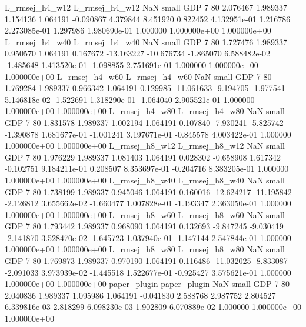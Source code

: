 L_rmsej_h4_w12 L_rmsej_h4_w12                   NaN      small      GDP                 7 80 2.076467       1.989337 1.154136       1.064191   -0.090867      4.379844      8.451920     0.822452   4.132951e-01  1.216786 2.273085e-01     1.297986   1.980690e-01            1.000000    1.000000e+00        1.000000e+00
L_rmsej_h4_w40 L_rmsej_h4_w40                   NaN      small      GDP                 7 80 1.727476       1.989337 0.950570       1.064191    0.167672    -13.163227    -10.676734    -1.865070   6.588482e-02 -1.485648 1.413520e-01    -1.098855   2.751691e-01            1.000000    1.000000e+00        1.000000e+00
L_rmsej_h4_w60 L_rmsej_h4_w60                   NaN      small      GDP                 7 80 1.769284       1.989337 0.966342       1.064191    0.129985    -11.061633     -9.194705    -1.977541   5.146818e-02 -1.522691 1.318290e-01    -1.064040   2.905521e-01            1.000000    1.000000e+00        1.000000e+00
L_rmsej_h4_w80 L_rmsej_h4_w80                   NaN      small      GDP                 7 80 1.831578       1.989337 1.002194       1.064191    0.107840     -7.930241     -5.825742    -1.390878   1.681677e-01 -1.001241 3.197671e-01    -0.845578   4.003422e-01            1.000000    1.000000e+00        1.000000e+00
L_rmsej_h8_w12 L_rmsej_h8_w12                   NaN      small      GDP                 7 80 1.976229       1.989337 1.081403       1.064191    0.028302     -0.658908      1.617342    -0.102751   9.184211e-01  0.208507 8.353697e-01    -0.204716   8.383205e-01            1.000000    1.000000e+00        1.000000e+00
L_rmsej_h8_w40 L_rmsej_h8_w40                   NaN      small      GDP                 7 80 1.738199       1.989337 0.945046       1.064191    0.160016    -12.624217    -11.195842    -2.126812   3.655662e-02 -1.660477 1.007828e-01    -1.193347   2.363050e-01            1.000000    1.000000e+00        1.000000e+00
L_rmsej_h8_w60 L_rmsej_h8_w60                   NaN      small      GDP                 7 80 1.793442       1.989337 0.968090       1.064191    0.132693     -9.847245     -9.030419    -2.141870   3.528470e-02 -1.645723 1.037940e-01    -1.147144   2.547844e-01            1.000000    1.000000e+00        1.000000e+00
L_rmsej_h8_w80 L_rmsej_h8_w80                   NaN      small      GDP                 7 80 1.769873       1.989337 0.970190       1.064191    0.116486    -11.032025     -8.833087    -2.091033   3.973939e-02 -1.445518 1.522677e-01    -0.925427   3.575621e-01            1.000000    1.000000e+00        1.000000e+00
  paper_plugin   paper_plugin                   NaN      small      GDP                 7 80 2.040836       1.989337 1.095986       1.064191   -0.041830      2.588768      2.987752     2.804527   6.339816e-03  2.818299 6.098230e-03     1.902809   6.070889e-02            1.000000    1.000000e+00        1.000000e+00
